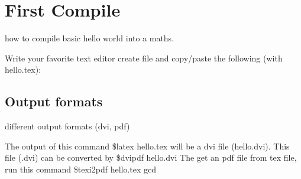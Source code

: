 \styledchapter

\section{First Compile}

how to compile basic hello world into a \gls{maths}.

Write your favorite text editor create file and copy/paste the following (with hello.tex):

\subsection{Output formats}

different output formats (dvi, pdf)

The output of this command \$latex hello.tex will be a dvi 
file (hello.dvi). This file (.dvi) can be converted by \$dvipdf 
hello.dvi The get an pdf file from tex file, run this 
command \$texi2pdf hello.tex \gls{gcd}